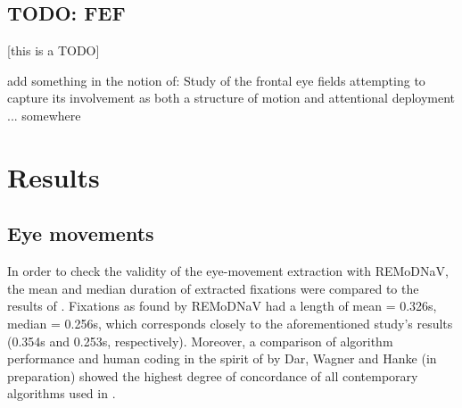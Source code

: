 \documentclass[a4paper, 12pt]{scrreprt}
\begin{document}
\section{TODO: FEF}
[this is a TODO]

add something in the notion of: Study of the frontal eye fields attempting to capture its involvement as both a structure of motion and attentional deployment ... somewhere


\chapter{Results}

\section{Eye movements}
In order to check the validity of the eye-movement extraction with REMoDNaV, the mean and median duration of extracted fixations were compared to the results of \textcite{dorr2010variability}. Fixations as found by REMoDNaV had a length of mean = 0.326s, median = 0.256s, which corresponds closely to the aforementioned study's results (0.354s and 0.253s, respectively). Moreover, a comparison of algorithm performance and human coding in the spirit of \textcite{andersson2017one} by Dar, Wagner and Hanke (in preparation) showed the highest degree of concordance of all contemporary algorithms used in \textcite{anderson2015comparison}.

\bigskip
\end{document}
